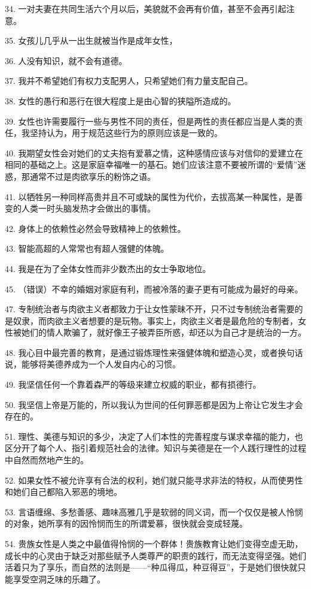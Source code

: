 34. 一对夫妻在共同生活六个月以后，美貌就不会再有价值，甚至不会再引起注意。

35. 女孩儿几乎从一出生就被当作是成年女性，

36. 人没有知识，就不会有道德。

37. 我并不希望她们有权力支配男人，只希望她们有力量支配自己。

38. 女性的愚行和恶行在很大程度上是由心智的狭隘所造成的。

39. 女性也许需要履行一些与男性不同的责任，但是两性的责任都应当是人类的责任，我坚持认为，用于规范这些行为的原则应该是一致的。

40. 我期望女性会对她们的丈夫抱有爱慕之情，这种感情应该与对信仰的爱建立在相同的基础之上。这是家庭幸福唯一的基石。她们应该注意不要被所谓的“爱情”迷惑，那通常不过是肉欲享乐的粉饰之语。

41. 以牺牲另一种同样高贵并且不可或缺的属性为代价，去拔高某一种属性，是善变的人类一时头脑发热才会做出的事情。

42. 身体上的依赖性必然会导致精神上的依赖性。

43. 智能高超的人常常也有超人强健的体魄。

44. 我是在为了全体女性而非少数杰出的女士争取地位。

45. （错误）不幸的婚姻对家庭有利，而被冷落的妻子更有可能成为最好的母亲。

47. 专制统治者与肉欲主义者都致力于让女性蒙昧不开，只不过专制统治者需要的是奴隶，而肉欲主义者想要的是玩物。事实上，肉欲主义者是最危险的专制者，女性被她们的情人欺骗了，就好像王子被弄臣所惑，却还以为自己才是统治的一方。

48. 我心目中最完善的教育，是通过锻炼理性来强健体魄和塑造心灵，或者换句话说，能够将美德养成为一个人发自内心的习惯。

49. 我坚信任何一个靠着森严的等级来建立权威的职业，都有损德行。

50. 我坚信上帝是万能的，所以我认为世间的任何罪恶都是因为上帝让它发生才会存在的。

51. 理性、美德与知识的多少，决定了人们本性的完善程度与谋求幸福的能力，也区分开了每个人、指引着规范社会的法律。知识与美德是在一个人践行理性的过程中自然而然地产生的。

52. 如果女性不被允许享有合法的权利，她们就只能寻求非法的特权，从而使男性和她们自己都陷入邪恶的境地。

53. 言语缠绵、多愁善感、趣味高雅几乎是软弱的同义词，而一个仅仅是被人怜悯的对象，她所享有的因怜悯而生的所谓爱慕，很快就会变成轻蔑。

54. 贵族女性是人类之中最值得怜悯的一个群体！贵族教育让她们变得空虚无助，成长中的心灵由于缺乏对那些赋予人类尊严的职责的践行，而无法变得坚强。她们活着只为了享乐，而自然的法则是——“种瓜得瓜，种豆得豆”，于是她们很快就只能享受空洞乏味的乐趣了。

